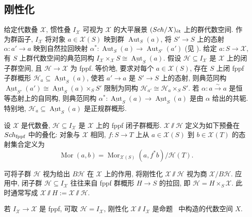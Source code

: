 \subsection{刚性化}\label{src:7.4.7-subsection}
给定代数叠 $\mathcal X$, 惯性叠 $I_{\mathcal X}$ 可视为 $\mathcal X$ 的大平展景 $(Sch/X)_{\text{ét}}$ 上的群代数空间. 作为群函子, $I_{\mathcal X}$ 将对象 $a\in\mathcal X(S)$ 映到群 $\operatorname{Aut}_S(a)$, 将 $S'\to S$ 上的态射 $\alpha:a'\to a$ 映到自然拉回映射 $\alpha^*:\operatorname{Aut}_S(a)\to\operatorname{Aut}_{S'}(a')$ (见 ). 给定 $a:S\to\mathcal X$, 有 $S$ 上群代数空间的典范同构 $I_{\mathcal X}\times_{\mathcal X}S\cong\underline{\operatorname{Aut}}_S(a)$.
假设 $\mathcal H\subseteq I_{\mathcal X}$ 是 $\mathcal X$ 上的闭子群空间, 且 $\mathcal H\to\mathcal X$ 为 fppf. 等价地, 要求对每个 $a\in\mathcal X(S)$, 存在 $S$ 上闭 fppf 子群概形 $\mathcal H_a\subseteq\underline{\operatorname{Aut}}_S(a)$, 使若 $a'\to a$ 是 $S'\to S$ 上的态射, 则典范同构 $\underline{\operatorname{Aut}}_{S'}(a')\cong\underline{\operatorname{Aut}}_S(a)\times_S S'$ 限制为同构 $\mathcal H_{a'}\cong\mathcal H_a\times_S S'$. 若 $\alpha:a\xrightarrow{\sim}a$ 是恒等态射上的自同构, 则典范同构 $\alpha^*:\underline{\operatorname{Aut}}_S(a)\to\underline{\operatorname{Aut}}_S(a)$ 是由 $\alpha$ 给出的共轭. 特别地, $\mathcal H_a\subseteq\underline{\operatorname{Aut}}_S(a)$ 是正规群概形.
\begin{definition}[刚性化]\label{src:7.4.53}
设 $\mathcal X$ 是代数叠, $\mathcal H\subseteq I_{\mathcal X}$ 是 $\mathcal X$ 上的 fppf 闭子群概形.  $\mathcal X\!\sslash\mathcal H$ 定义为如下预叠在 $Sch_{\mathrm{fppf}}$ 中的叠化: 对象与 $\mathcal X$ 相同, $f:S\to T$ 上从 $a\in\mathcal X(S)$ 到 $b\in\mathcal X(T)$ 的态射集合定义为
\[
\operatorname{Mor}(a,b)=\operatorname{Mor}_{\mathcal X(S)}(a,f^*b)/\mathcal H(T).
\]
\end{definition}
可将子群 $\mathcal H$ 视为给出 $B\mathcal H$ 在 $\mathcal X$ 上的作用, 将刚性化 $\mathcal X\!\sslash\mathcal H$ 视为商 $\mathcal X/B\mathcal H$. 应用中, 闭子群 $\mathcal H\subseteq I_{\mathcal X}$ 往往来自 fppf 群概形 $H\to S$ 的拉回, 即 $\mathcal H=H\times_S\mathcal X$. 此时通常写成 $\mathcal X\!\sslash H:=\mathcal X\!\sslash\mathcal H$.
\begin{example}\label{src:7.4.54}
若 $I_{\mathcal X}\to\mathcal X$ 是 fppf, 可取 $\mathcal H=I_{\mathcal X}$, 刚性化 $\mathcal X\!\sslash I_{\mathcal X}$ 是命题~ 中构造的代数空间 $X$.
\end{example}
